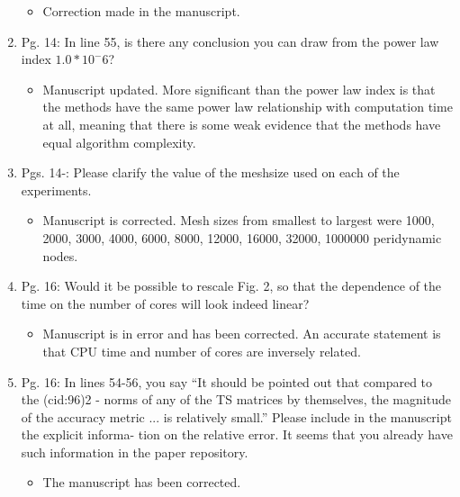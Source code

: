 \documentclass{article}
\begin{document}
\begin{enumerate}
{\color{red}  
\begin{itemize}
    \item
        Correction made in the manuscript. 
  \end{itemize}}

  \item
    Pg. 14: In line 55, is there any conclusion you can draw from the power law index
    $1.0 * 10^-6$?

{\color{red}  
\begin{itemize}
     \item
      Manuscript updated. More significant than the power law index is that the methods have the same power law relationship with computation time at all, meaning that there is some weak evidence that the methods have equal algorithm complexity. 
  \end{itemize}}

  \item
    Pgs. 14-: Please clarify the value of the meshsize used on each of the experiments.

{\color{red}  
\begin{itemize}
     \item
         Manuscript is corrected. Mesh sizes from smallest to largest were 1000, 2000, 3000, 4000, 6000, 8000, 12000,
         16000, 32000, 1000000 peridynamic nodes.
      \end{itemize}}

  \item
    Pg. 16: Would it be possible to rescale Fig. 2, so that the dependence of the time
    on the number of cores will look indeed linear?

{\color{red}  
\begin{itemize}
     \item
     Manuscript is in error and has been corrected. An accurate statement is that CPU time and number of cores are inversely related.
  \end{itemize}}

  \item
    Pg. 16: In lines 54-56, you say “It should be pointed out that compared to the (cid:96)2 -
    norms of any of the TS matrices by themselves, the magnitude of the accuracy
    metric ... is relatively small.” Please include in the manuscript the explicit informa-
    tion on the relative error. It seems that you already have such information in the
    paper repository.

{\color{red}  
\begin{itemize}
     \item
    The manuscript has been corrected. 
    \end{itemize}}


\end{enumerate}
\end{document}
